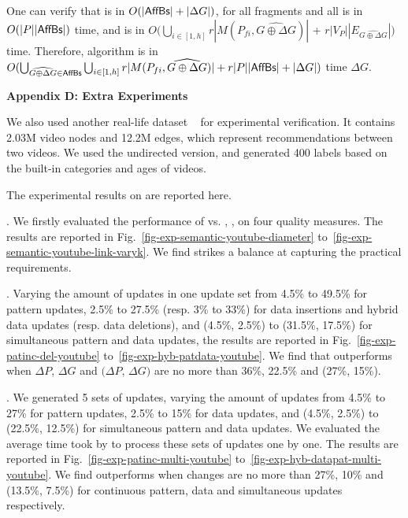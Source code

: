 \vspace{-1.5ex}
One can verify that \identifyaffball is in $O(|{\mathsf{AffBs}}| + |\Delta G|)$,
\incmatch for all fragments and all \affballsx is in $O(|P||{\mathsf{AffBs}}|)$ time, and \comb is in $O(\bigcup_{i\in[1,h]}r|M(P_{fi}, \widehat{G\oplus\Delta G})|$ + $r|V_{P}||E_{\widehat{G\oplus\Delta G}}|)$ time.
Therefore, algorithm \incd is in
$O(\bigcup_{\widehat{G\oplus\Delta G}\in {\ensuremath {\mathsf{AffBs}}}} \bigcup_{i\in[1,h]}r|M(P_{fi}, \widehat{G\oplus\Delta G})|+r|P||{\mathsf{AffBs}}| + |\Delta G|)$ time \wrt $\Delta G$.

\vspace{1ex}
\noindent
{\large \textbf{Appendix D: Extra Experiments}}
\label{sec-apd-exp}

\vspace{-0.5ex}

We also used another real-life dataset {\em \youtube}~\cite{youtubeWeb} for experimental verification.
It contains 2.03M video nodes and 12.2M edges, which represent recommendations between two videos. We used the undirected version, and generated 400 labels based on the built-in categories and ages of videos.

\vspace{-1.5ex}
The experimental results on \youtube are reported here.

\vspace{-1.8ex}
. We firstly evaluated the performance of \optgrouprec vs. \mindia, \minsumdis, \denalk on \youtube \wrt four quality measures.
The results are reported in Fig.~\ref{fig-exp-semantic-youtube-diameter} to~\ref{fig-exp-semantic-youtube-link-varyk}.
We find \optgrouprec strikes a balance at capturing the practical requirements.

\vspace{-1.8ex}
. Varying the amount of updates in one update set from 4.5\% to 49.5\% for pattern updates, 2.5\% to 27.5\% (resp. 3\% to 33\%) for data insertions and hybrid data updates (resp. data deletions), and (4.5\%, 2.5\%) to (31.5\%, 17.5\%) for simultaneous pattern and data updates, the results are reported in Fig.~\ref{fig-exp-patinc-del-youtube} to~\ref{fig-exp-hyb-patdata-youtube}.
We find that \inc outperforms \optgrouprec when $\Delta P$, $\Delta G$ and $(\Delta P$, $\Delta G)$ are no more than 36\%, 22.5\% and (27\%, 15\%).

\vspace{-1.8ex}
. We generated 5 sets of updates,
varying the amount of updates from 4.5\% to 27\% for pattern updates, 2.5\% to 15\% for data updates,
and (4.5\%, 2.5\%) to (22.5\%, 12.5\%) for simultaneous pattern and data updates.
We evaluated the average time took by \inc to process these sets of updates one by one.
The results are reported in Fig.~\ref{fig-exp-patinc-multi-youtube} to~\ref{fig-exp-hyb-datapat-multi-youtube}.
We find \inc outperforms \optgrouprec when changes are no more than 27\%, 10\% and (13.5\%, 7.5\%) for continuous pattern, data and simultaneous updates respectively.

